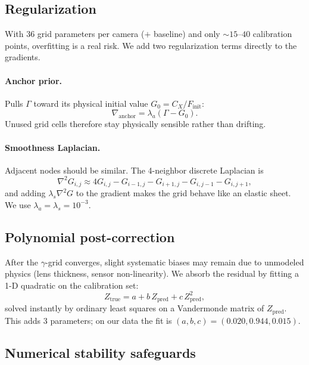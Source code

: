 \documentclass[11pt]{article}
\begin{document}
\subsection{Regularization}

With $36$ grid parameters per camera ($+$ baseline) and only $\sim 15$--$40$ calibration
points, overfitting is a real risk. We add two regularization terms directly to the
gradients.

\paragraph{Anchor prior.} Pulls $\Gamma$ toward its physical initial value $G_0 = C_X /
F_\text{init}$:
\begin{equation}
\nabla_\text{anchor} = \lambda_a (\Gamma - G_0).
\end{equation}
Unused grid cells therefore stay physically sensible rather than drifting.

\paragraph{Smoothness Laplacian.} Adjacent nodes should be similar. The 4-neighbor
discrete Laplacian is
\begin{equation}
\nabla^2 G_{i,j} \approx 4 G_{i,j} - G_{i-1,j} - G_{i+1,j} - G_{i,j-1} - G_{i,j+1},
\end{equation}
and adding $\lambda_s \nabla^2 G$ to the gradient makes the grid behave like an elastic
sheet. We use $\lambda_a = \lambda_s = 10^{-3}$.

\subsection{Polynomial post-correction}

After the $\gamma$-grid converges, slight systematic biases may remain due to unmodeled
physics (lens thickness, sensor non-linearity). We absorb the residual by fitting a 1-D
quadratic on the calibration set:
\begin{equation}
Z_\text{true} = a + b\, Z_\text{pred} + c\, Z_\text{pred}^2,
\end{equation}
solved instantly by ordinary least squares on a Vandermonde matrix of $Z_\text{pred}$.
This adds $3$ parameters; on our data the fit is $(a, b, c) = (0.020, 0.944, 0.015)$.

\subsection{Numerical stability safeguards}
\end{document}
